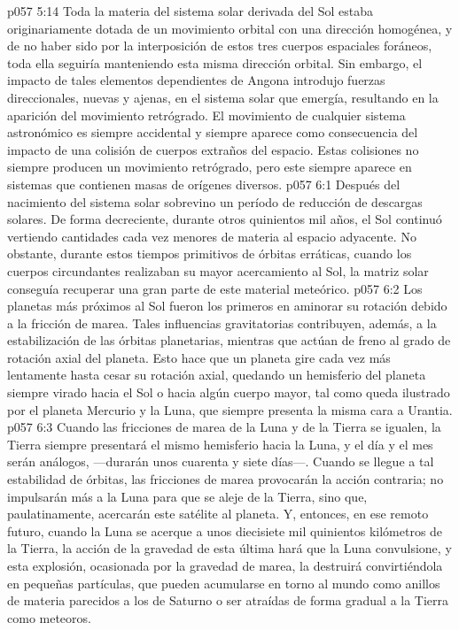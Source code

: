 \vs p057 5:14 Toda la materia del sistema solar derivada del Sol estaba originariamente dotada de un movimiento orbital con una dirección homogénea, y de no haber sido por la interposición de estos tres cuerpos espaciales foráneos, toda ella seguiría manteniendo esta misma dirección orbital. Sin embargo, el impacto de tales elementos dependientes de Angona introdujo fuerzas direccionales, nuevas y ajenas, en el sistema solar que emergía, resultando en la aparición del movimiento retrógrado. El movimiento  de cualquier sistema astronómico es siempre accidental y siempre aparece como consecuencia del impacto de una colisión de cuerpos extraños del espacio. Estas colisiones no siempre producen un movimiento retrógrado, pero este siempre aparece en sistemas que contienen masas de orígenes diversos.
\vs p057 6:1 Después del nacimiento del sistema solar sobrevino un período de reducción de descargas solares. De forma decreciente, durante otros quinientos mil años, el Sol continuó vertiendo cantidades cada vez menores de materia al espacio adyacente. No obstante, durante estos tiempos primitivos de órbitas erráticas, cuando los cuerpos circundantes realizaban su mayor acercamiento al Sol, la matriz solar conseguía recuperar una gran parte de este material meteórico.
\vs p057 6:2 \pc Los planetas más próximos al Sol fueron los primeros en aminorar su rotación debido a la fricción de marea. Tales influencias gravitatorias contribuyen, además, a la estabilización de las órbitas planetarias, mientras que actúan de freno al grado de rotación axial del planeta. Esto hace que un planeta gire cada vez más lentamente hasta cesar su rotación axial, quedando un hemisferio del planeta siempre virado hacia el Sol o hacia algún cuerpo mayor, tal como queda ilustrado por el planeta Mercurio y la Luna, que siempre presenta la misma cara a Urantia.
\vs p057 6:3 Cuando las fricciones de marea de la Luna y de la Tierra se igualen, la Tierra siempre presentará el mismo hemisferio hacia la Luna, y el día y el mes serán análogos, ---durarán unos cuarenta y siete días---. Cuando se llegue a tal estabilidad de órbitas, las fricciones de marea provocarán la acción contraria; no impulsarán más a la Luna para que se aleje de la Tierra, sino que, paulatinamente, acercarán este satélite al planeta. Y, entonces, en ese remoto futuro, cuando la Luna se acerque a unos diecisiete mil quinientos kilómetros de la Tierra, la acción de la gravedad de esta última hará que la Luna convulsione, y esta explosión, ocasionada por la gravedad de marea, la destruirá convirtiéndola en pequeñas partículas, que pueden acumularse en torno al mundo como anillos de materia parecidos a los de Saturno o ser atraídas de forma gradual a la Tierra como meteoros.
